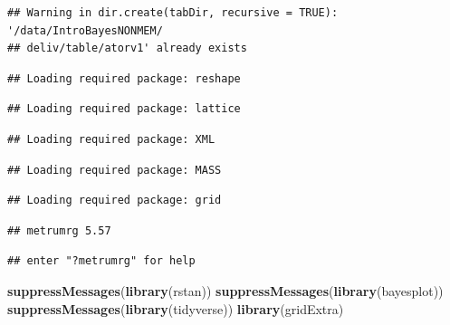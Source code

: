 \documentclass[]{article}
\newenvironment{Shaded}{\begin{snugshade}}{\end{snugshade}}
\newcommand{\KeywordTok}[1]{\textcolor[rgb]{0.13,0.29,0.53}{\textbf{{#1}}}}
\newcommand{\DataTypeTok}[1]{\textcolor[rgb]{0.13,0.29,0.53}{{#1}}}
\newcommand{\StringTok}[1]{\textcolor[rgb]{0.31,0.60,0.02}{{#1}}}
\newcommand{\NormalTok}[1]{{#1}}
\begin{document}
\begin{verbatim}
## Warning in dir.create(tabDir, recursive = TRUE): '/data/IntroBayesNONMEM/
## deliv/table/atorv1' already exists
\end{verbatim}

\begin{Shaded}
\end{Shaded}

\begin{verbatim}
## Loading required package: reshape
\end{verbatim}

\begin{verbatim}
## Loading required package: lattice
\end{verbatim}

\begin{verbatim}
## Loading required package: XML
\end{verbatim}

\begin{verbatim}
## Loading required package: MASS
\end{verbatim}

\begin{verbatim}
## Loading required package: grid
\end{verbatim}

\begin{verbatim}
## metrumrg 5.57
\end{verbatim}

\begin{verbatim}
## enter "?metrumrg" for help
\end{verbatim}

\begin{Shaded}
\begin{Highlighting}[]
\KeywordTok{suppressMessages}\NormalTok{(}\KeywordTok{library}\NormalTok{(rstan))}
\KeywordTok{suppressMessages}\NormalTok{(}\KeywordTok{library}\NormalTok{(bayesplot))}
\KeywordTok{suppressMessages}\NormalTok{(}\KeywordTok{library}\NormalTok{(tidyverse))}
\KeywordTok{library}\NormalTok{(gridExtra)}
\end{Highlighting}
\end{Shaded}
\end{document}
